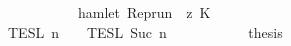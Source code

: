 \begin{isabellebody}
\ \ \ \ \ \ \ \ \ \ \ \ \ \ \ \ \ \ \ \ \ \ \ \ \ \ \ \ {\isasymlongrightarrow}\ hamlet\ {\isacharparenleft}{\isacharparenleft}Rep{\isacharunderscore}run\ {\isasymrho}{\isacharparenright}\ z\ K\ {\isacharbraceright}\isanewline
\ \ \ \ \ \ \ \ \ \ \ \ \ \ \ \ {\isasyminter}\ {\isasymlbrakk}{\isasymlbrakk}\ {\isasymPsi}\ {\isasymrbrakk}{\isasymrbrakk}\isactrlsub T\isactrlsub E\isactrlsub S\isactrlsub L\isactrlbsup {\isasymge}\ n\isactrlesup \ {\isasyminter}\ {\isasymlbrakk}{\isasymlbrakk}\ {\isasymPhi}\ {\isasymrbrakk}{\isasymrbrakk}\isactrlsub T\isactrlsub E\isactrlsub S\isactrlsub L\isactrlbsup {\isasymge}\ Suc\ n\isactrlesup {\isacartoucheclose}\isanewline
\ \ \ \ \isamarkupfalse%
\isanewline
\ \ \ \isamarkupfalse%
\ \isamarkupfalse%
\ {\isacharquery}thesis\ \ \isamarkupfalse%
\isanewline
\ \isamarkupfalse%
%
\endisatagproof
{\isafoldproof}%
%
\isadelimproof
\isanewline
%
\endisadelimproof
%
\isadelimtheory
\isanewline
%
\endisadelimtheory
%
\isatagtheory
{}\isamarkupfalse%
%
\endisatagtheory
{\isafoldtheory}%
%
\isadelimtheory
%
\endisadelimtheory
%
\end{isabellebody}%
\endinput
